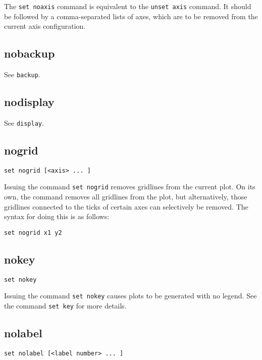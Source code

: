 The {\tt set noaxis} command is equivalent to the {\tt unset axis} command. It
should be followed by a comma-separated lists of axes, which are to be removed
from the current axis configuration.


\subsection{nobackup}

See {\tt backup}.


\subsection{nodisplay}

See {\tt display}.


\subsection{nogrid}

\begin{verbatim}
set nogrid [<axis> ... ]
\end{verbatim}

Issuing the command {\tt set nogrid} removes gridlines from the current plot. On
its own, the command removes all gridlines from the plot, but alternatively,
those gridlines connected to the ticks of certain axes can selectively be
removed.  The syntax for doing this is as follows:

\begin{verbatim}
set nogrid x1 y2
\end{verbatim}


\subsection{nokey}

\begin{verbatim}
set nokey
\end{verbatim}

Issuing the command {\tt set nokey} causes plots to be generated with no legend.
See the command {\tt set key} for more details.


\subsection{nolabel}

\begin{verbatim}
set nolabel [<label number> ... ]
\end{verbatim}

